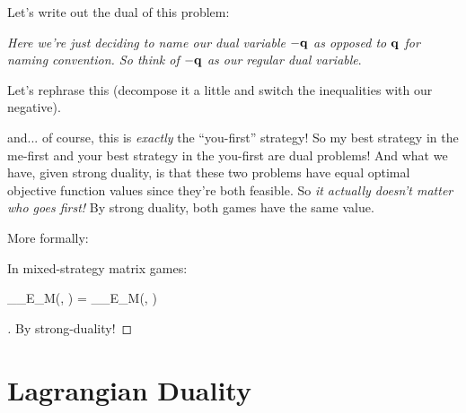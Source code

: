 Let's write out the dual of this problem:

\textit{Here we're just deciding to name our dual variable $-\mathbf{q}$ as opposed to $\mathbf{q}$ for
naming convention. So think of $-\mathbf{q}$ as our regular dual variable}. 

Let's rephrase this (decompose it a little and switch the inequalities with our negative).

and... of course, this is \textit{exactly} the ``you-first'' strategy!
So my best strategy in the me-first and your best strategy in the you-first
are dual problems! And what we have, given strong duality, is that these two
problems have equal optimal objective function values since they're both
feasible. So \textit{it actually doesn't matter who goes first!} By strong
duality, both games have the same value.

More formally:

\begin{theo}{}{}
In mixed-strategy matrix games:
\begin{frml}
	\max_\vp \min_\vq E_M(\vp, \vq) = \min_\vq \max_\vp E_M(\vp, \vq)
\end{frml}
\end{theo}

\begin{proof}[]
By strong-duality!
\end{proof}

\pagebreak
\section{Lagrangian Duality}

